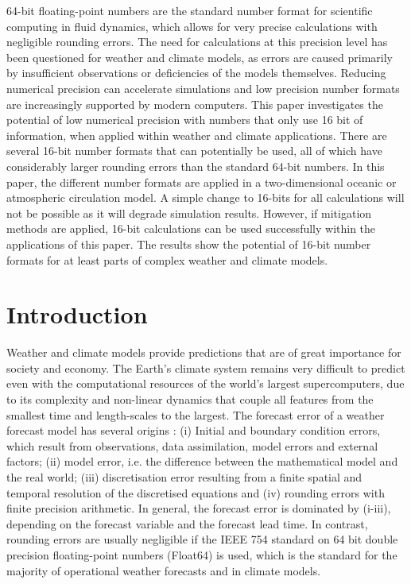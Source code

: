 \documentclass[draft]{agujournal2019}
\begin{document}
64-bit floating-point numbers are the standard number format for scientific
computing in fluid dynamics, which allows for very precise calculations with
negligible rounding errors. The need for calculations at this precision level
has been questioned for weather and climate models, as errors are caused
primarily by insufficient observations or deficiencies of the models themselves.
Reducing numerical precision can accelerate simulations and low precision number
formats are increasingly supported by modern computers. This paper investigates
the potential of low numerical precision with numbers that only use 16 bit of
information, when applied within weather and climate applications. There are
several 16-bit number formats that can potentially be used, all of which have
considerably larger rounding errors than the standard 64-bit numbers. In this
paper, the different number formats are applied in a two-dimensional oceanic or
atmospheric circulation model. A simple change to 16-bits for all calculations
will not be possible as it will degrade simulation results. However, if mitigation
methods are applied, 16-bit calculations can be used successfully within the
applications of this paper. The results show the potential of 16-bit number
formats for at least parts of complex weather and climate models.

\section{Introduction}
\label{sec:intro}

Weather and climate models provide predictions that are of great importance for society and economy. The Earth's climate system remains very difficult to predict even with the computational resources of the world's largest supercomputers, due to its complexity and non-linear dynamics that couple all features from the smallest time and length-scales to the largest. The forecast error of a weather forecast model has several origins \cite{Palmer2012,Palmer2015}: (i) Initial and boundary condition errors, which result from observations, data assimilation, model errors and external factors; (ii) model error, i.e. the difference between the mathematical model and the real world; (iii) discretisation error resulting from a finite spatial and temporal resolution of the discretised equations and (iv) rounding errors with finite precision arithmetic. In general, the forecast error is dominated by (i-iii), depending on the forecast variable and the forecast lead time. In contrast, rounding errors are usually negligible if the IEEE 754 standard on 64 bit double precision floating-point numbers (Float64) is used, which is the standard for the majority of operational weather forecasts and in climate models.
\end{document}
